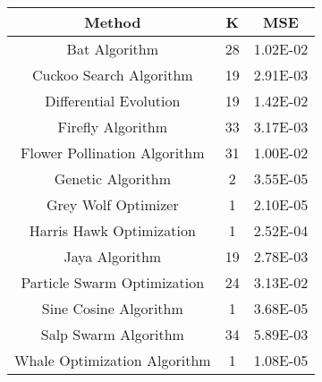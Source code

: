 \documentclass{article}
\begin{document}
\begin{table}
  \centering

	\begin{tabular}{ccc}
	\toprule
	Method & K & MSE \\
	\midrule
	Bat Algorithm & 28 & \num{1.02E-02} \\
	Cuckoo Search Algorithm & 19 & \num{2.91E-03} \\
	Differential Evolution & 19 & \num{1.42E-02} \\
	Firefly Algorithm & 33 & \num{3.17E-03} \\
	Flower Pollination Algorithm & 31 & \num{1.00E-02} \\
	Genetic Algorithm & 2 & \num{3.55E-05} \\
	Grey Wolf Optimizer & 1 & \num{2.10E-05} \\
	Harris Hawk Optimization & 1 & \num{2.52E-04} \\
	Jaya Algorithm & 19 & \num{2.78E-03} \\
	Particle Swarm Optimization & 24 & \num{3.13E-02} \\
	Sine Cosine Algorithm & 1 & \num{3.68E-05} \\
	Salp Swarm Algorithm & 34 & \num{5.89E-03} \\
	Whale Optimization Algorithm & 1 & \num{1.08E-05} \\
	\bottomrule
	\end{tabular}

\end{table}
\end{document}
